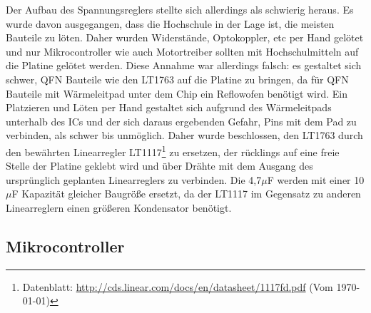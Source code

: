 \documentclass{scrartcl}
\begin{document}
Der Aufbau des Spannungsreglers stellte sich allerdings als schwierig heraus. Es wurde davon ausgegangen, dass die Hochschule in der Lage ist, die meisten Bauteile zu löten. Daher wurden Widerstände, Optokoppler, etc per Hand gelötet und nur Mikrocontroller wie auch Motortreiber sollten mit Hochschulmitteln auf die Platine gelötet werden. Diese Annahme war allerdings falsch: es gestaltet sich schwer, QFN Bauteile wie den LT1763 auf die Platine zu bringen, da für QFN Bauteile mit Wärmeleitpad unter dem Chip ein Reflowofen benötigt wird. Ein Platzieren und Löten per Hand gestaltet sich aufgrund des Wärmeleitpads unterhalb des ICs und der sich daraus ergebenden Gefahr, Pins mit dem Pad zu verbinden, als schwer bis unmöglich. Daher wurde beschlossen, den LT1763 durch den bewährten Linearregler LT1117\footnote{Datenblatt: \url{http://cds.linear.com/docs/en/datasheet/1117fd.pdf} (Vom \today)} zu ersetzen, der rücklings auf eine freie Stelle der Platine geklebt wird und über Drähte mit dem Ausgang des ursprünglich geplanten Linearreglers zu verbinden. Die 4,7$\mu$F werden mit einer 10$\mu$F Kapazität gleicher Baugröße ersetzt, da der LT1117 im Gegensatz zu anderen Linearreglern einen größeren Kondensator benötigt.

\subsection{Mikrocontroller}
\end{document}
